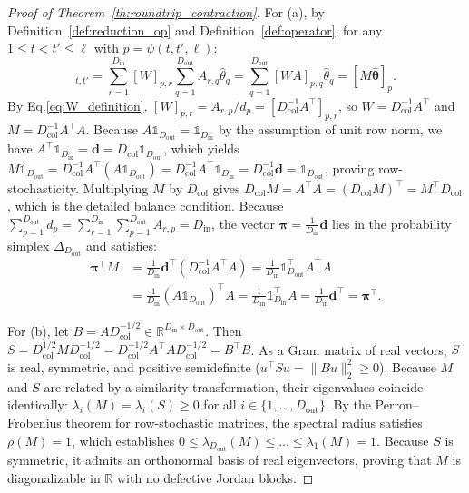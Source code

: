 \documentclass[default,sn-mathphys,Numbered]{sn-jnl}
\theoremstyle{thmstyleone}
\theoremstyle{thmstylethree}
\theoremstyle{thmstyletwo}
\newcommand{\inp}{\text{in}}
\newcommand{\outp}{\text{out}}
\newcommand{\eqnref}[1]{\eqref{#1}}
\begin{document}
\begin{appendices}
\begin{proof}[Proof of Theorem~\ref{th:roundtrip_contraction}]
For (a), by Definition~\ref{def:reduction_op} and Definition~\ref{def:operator}, for any $1 \le t < t' \le \ell$ with $p = \psi(t, t', \ell)$:
\begin{equation}
[\mathcal{P}(\hat{\Theta})]_{t, t'} = \sum_{r=1}^{D_{\inp}} [W]_{p, r} \sum_{q=1}^{D_{\outp}} A_{r, q} \hat{\theta}_q = \sum_{q=1}^{D_{\outp}} [W A]_{p, q} \hat{\theta}_q = [M \hat{\bm{\theta}}]_p.
\end{equation}
By Eq.\eqnref{eq:W_definition}, $[W]_{p, r} = A_{r, p} / d_p = [D_{\mathrm{col}}^{-1} A^\top]_{p, r}$, so $W = D_{\mathrm{col}}^{-1} A^\top$ and $M = D_{\mathrm{col}}^{-1} A^\top A$.
Because $A \mathds{1}_{D_{\outp}} = \mathds{1}_{D_{\inp}}$ by the assumption of unit row norm, we have $A^\top \mathds{1}_{D_{\inp}} = \bm{d} = D_{\mathrm{col}} \mathds{1}_{D_{\outp}}$, which yields $M \mathds{1}_{D_{\outp}} = D_{\mathrm{col}}^{-1} A^\top (A \mathds{1}_{D_{\outp}}) = D_{\mathrm{col}}^{-1} A^\top \mathds{1}_{D_{\inp}} = D_{\mathrm{col}}^{-1} \bm{d} = \mathds{1}_{D_{\outp}}$, proving row-stochasticity.
Multiplying $M$ by $D_{\mathrm{col}}$ gives $D_{\mathrm{col}} M = A^\top A = (D_{\mathrm{col}} M)^\top = M^\top D_{\mathrm{col}}$, which is the detailed balance condition.
Because $\sum_{p=1}^{D_{\outp}} d_p = \sum_{r=1}^{D_{\inp}} \sum_{p=1}^{D_{\outp}} A_{r, p} = D_{\inp}$, the vector $\bm{\pi} = \frac{1}{D_{\inp}}\bm{d}$ lies in the probability simplex $\Delta_{D_{\outp}}$ and satisfies:
\begin{equation}
\begin{split}
\bm{\pi}^\top M &= \frac{1}{D_{\inp}} \bm{d}^\top (D_{\mathrm{col}}^{-1} A^\top A) = \frac{1}{D_{\inp}} \mathds{1}_{D_{\outp}}^\top A^\top A \\
&= \frac{1}{D_{\inp}} (A \mathds{1}_{D_{\outp}})^\top A = \frac{1}{D_{\inp}} \mathds{1}_{D_{\inp}}^\top A = \frac{1}{D_{\inp}} \bm{d}^\top = \bm{\pi}^\top.
\end{split}
\end{equation}

For (b), let $B = A D_{\mathrm{col}}^{-1/2} \in \mathbb{R}^{D_{\inp} \times D_{\outp}}$. Then $S = D_{\mathrm{col}}^{1/2} M D_{\mathrm{col}}^{-1/2} = D_{\mathrm{col}}^{-1/2} A^\top A D_{\mathrm{col}}^{-1/2} = B^\top B$.
As a Gram matrix of real vectors, $S$ is real, symmetric, and positive semidefinite ($u^\top S u = \|B u\|_2^2 \ge 0$).
Because $M$ and $S$ are related by a similarity transformation, their eigenvalues coincide identically: $\lambda_i(M) = \lambda_i(S) \ge 0$ for all $i \in \{1, \dots, D_{\outp}\}$.
By the Perron--Frobenius theorem for row-stochastic matrices, the spectral radius satisfies $\rho(M) = 1$, which establishes $0 \le \lambda_{D_{\outp}}(M) \le \dots \le \lambda_1(M) = 1$.
Because $S$ is symmetric, it admits an orthonormal basis of real eigenvectors, proving that $M$ is diagonalizable in $\mathbb{R}$ with no defective Jordan blocks.


\end{proof}
\end{appendices}
\end{document}
